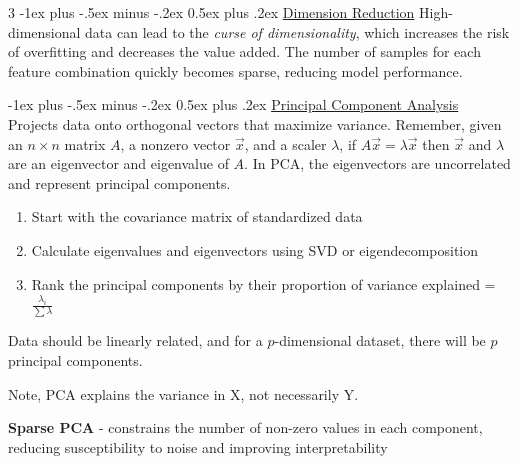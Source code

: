 \documentclass[10pt,landscape,letterpaper]{article}
\makeatletter
\renewcommand{\section}{\@startsection{section}{1}{0mm}%
                                {-1ex plus -.5ex minus -.2ex}%
                                {0.5ex plus .2ex}%
                                {\normalfont\large\bfseries}}
\renewcommand{\subsection}{\@startsection{subsection}{2}{0mm}%
                                {-1ex plus -.5ex minus -.2ex}%
                                {0.5ex plus .2ex}%
                                {\normalfont\normalsize\bfseries}}
\makeatother
\begin{document}
\begin{multicols}{3}
\section{\href{https://migue-rc.github.io/Data-Science-Cheatsheet/\#dimension-reduction}{Dimension Reduction}}
High-dimensional data can lead to the \emph{curse of dimensionality}, which increases the risk of overfitting and decreases the value added. The number of samples for each feature combination quickly becomes sparse, reducing model performance.

\subsection{\href{https://migue-rc.github.io/Data-Science-Cheatsheet/\#principal-component-analysis}{Principal Component Analysis}}
Projects data onto orthogonal vectors that maximize variance.
Remember, given an $n\times n$ matrix $A$, a nonzero vector $\vec{x}$, and a scaler $\lambda$, if $A\vec{x} = \lambda \vec{x}$ then $\vec{x}$ and $\lambda$ are an eigenvector and eigenvalue of $A$. In PCA, the eigenvectors are uncorrelated and represent principal components.
\begin{enumerate}[leftmargin=5mm]
\itemsep -.4mm
\item Start with the covariance matrix of standardized data
\item Calculate eigenvalues and eigenvectors using SVD or eigendecomposition
\item Rank the principal components by their proportion of variance explained = $\frac{\lambda_i}{\sum{\lambda}}$
\end{enumerate}

Data should be linearly related, and for a $p$-dimensional dataset, there will be $p$ principal components.

Note, PCA explains the variance in X, not necessarily Y.

\textbf{Sparse PCA} - constrains the number of non-zero values in each component, reducing susceptibility to noise and improving interpretability

\end{multicols}
\end{document}
